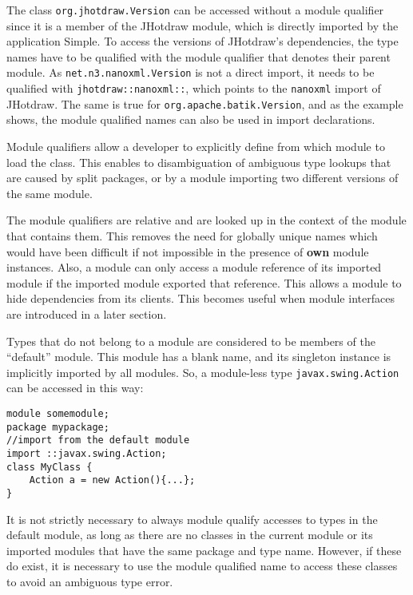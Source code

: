 The class \texttt{org.jhotdraw.Version} can be accessed without
a module qualifier since it is a member of the JHotdraw module, 
which is directly imported by the application Simple. To access
the versions of JHotdraw's dependencies, the type names have to
be qualified with the module qualifier that denotes their parent
module. As \texttt{net.n3.nanoxml.Version} is not a direct import,
it needs to be qualified with \texttt{jhotdraw::nanoxml::}, which
points to the \texttt{nanoxml} import of JHotdraw. The same is
true for \texttt{org.apache.batik.Version}, and as the example shows,
the module qualified names can also be used in import declarations.

Module qualifiers allow a developer to explicitly define from which module
to load the class. This enables to disambiguation of ambiguous type
lookups that are caused by split packages, or by a module importing
two different versions of the same module.

The module qualifiers are relative and are looked up in the context 
of the module that contains them. This removes the need for globally
unique names which would have been difficult if not impossible in the
presence of \textbf{own} module instances. Also, a module can only
access a module reference of its imported module if the imported module
exported that reference. This allows a module to hide dependencies from
its clients. This becomes useful when module interfaces are introduced
in a later section.

Types that do not belong to a module are considered to be members of
the ``default'' module. This module has a blank name, and its singleton
instance is implicitly imported by all modules. So, a module-less
type {\tt javax.swing.Action} can be accessed in this way:

\begin{lstlisting}[caption=Default Module Lookups]
module somemodule;
package mypackage;
//import from the default module
import ::javax.swing.Action;
class MyClass {
	Action a = new Action(){...};
}
\end{lstlisting}

It is not strictly necessary to always module qualify accesses to types in
the default module, as long as there are no classes in the current module
or its imported modules that have the same package and type name. However,
if these do exist, it is necessary to use the module qualified name to access
these classes to avoid an ambiguous type error.


